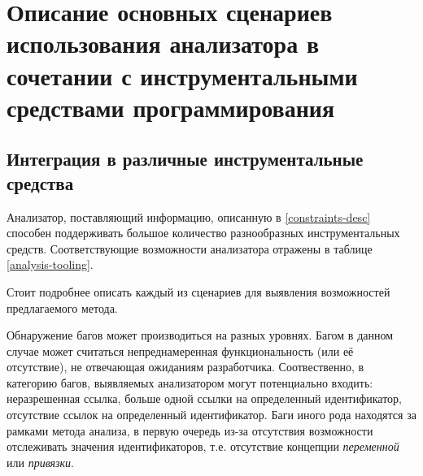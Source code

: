 \chapter{Описание основных сценариев использования анализатора в сочетании с
инструментальными средствами программирования}

\section{Интеграция в различные инструментальные средства}

Анализатор, поставляющий информацию, описанную в \ref{constraints-desc} способен
поддерживать большое количество разнообразных инструментальных средств. Соответствующие
возможности анализатора отражены в таблице \ref{analysis-tooling}.

\begin{table}[h]
    \caption{Поддержка анализатором различных сценариев использования инструментальных средств}
    \label{analysis-tooling}
\end{table}

Стоит подробнее описать каждый из сценариев для выявления возможностей предлагаемого метода.

Обнаружение багов может производиться на разных уровнях. Багом в данном случае может
считаться непреднамеренная функциональность (или её отсутствие), не отвечающая ожиданиям разработчика.
Соотвественно, в категорию багов, выявляемых анализатором могут потенциально входить:
неразрешенная ссылка, больше одной ссылки на определенный идентификатор, отсутствие ссылок
на определенный идентификатор. Баги иного рода находятся за рамками метода анализа, в первую
очередь из-за отсутствия возможности отслеживать значения идентификаторов, т.е.
отсутствие концепции \textit{переменной} или \textit{привязки}.

